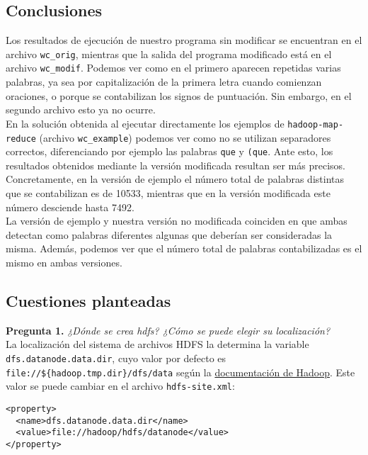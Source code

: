\documentclass[11pt]{article}
\begin{document}
\subsection{Conclusiones}

Los resultados de ejecución de nuestro programa sin modificar se encuentran en el archivo \verb|wc_orig|, mientras que la salida del programa modificado está en el archivo \verb|wc_modif|. Podemos ver como en el primero aparecen repetidas varias palabras, ya sea por capitalización de la primera letra cuando comienzan oraciones, o porque se contabilizan los signos de puntuación. Sin embargo, en el segundo archivo esto ya no ocurre.\\

En la solución obtenida al ejecutar directamente los ejemplos de \verb|hadoop-map-reduce| (archivo \texttt{wc\_example}) podemos ver como no se utilizan separadores correctos, diferenciando por ejemplo las palabras \texttt{que} y \texttt{(que}. Ante esto, los resultados obtenidos mediante la versión modificada resultan ser más precisos. Concretamente, en la versión de ejemplo el número total de palabras distintas que se contabilizan es de 10533, mientras que en la versión modificada este número desciende hasta 7492.\\

La versión de ejemplo y nuestra versión no modificada coinciden en que ambas detectan como palabras diferentes algunas que deberían ser consideradas la misma. Además, podemos ver que el número total de palabras contabilizadas es el mismo en ambas versiones.

\subsection{Cuestiones planteadas}

\textbf{Pregunta 1. }\textit{¿Dónde se crea hdfs? ¿Cómo se puede elegir su localización?}\\

La localización del sistema de archivos HDFS la determina la variable \texttt{dfs.datanode.data.dir}, cuyo valor por defecto es \verb|file://${hadoop.tmp.dir}/dfs/data| según la \href{https://hadoop.apache.org/docs/r2.4.1/hadoop-project-dist/hadoop-hdfs/hdfs-default.xml}{documentación de Hadoop}. Este valor se puede cambiar en el archivo \texttt{hdfs-site.xml}:

\begin{verbatim}
<property>
  <name>dfs.datanode.data.dir</name>
  <value>file://hadoop/hdfs/datanode</value>
</property>
\end{verbatim}
\end{document}
